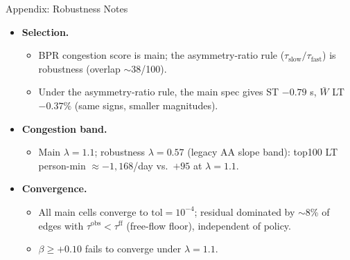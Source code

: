 \documentclass[11pt,aspectratio=169]{beamer}
\newcommand{\back}[1]{\hyperlink{#1}{\beamerreturnbutton{back}}}
\begin{document}
\begin{frame}{Appendix: Robustness Notes}
\begin{itemize}\small
  \item \textbf{Selection.}
  \begin{itemize}\footnotesize
    \item BPR congestion score is main; the asymmetry-ratio rule ($\tau_{\text{slow}}/\tau_{\text{fast}}$) is robustness (overlap $\sim$38/100).
    \item Under the asymmetry-ratio rule, the main spec gives ST $-0.79$ s, $\bar W$ LT $-0.37\%$ (same signs, smaller magnitudes).
  \end{itemize}
  \item \textbf{Congestion band.}
  \begin{itemize}\footnotesize
    \item Main $\lambda=1.1$; robustness $\lambda=0.57$ (legacy AA slope band): top100 LT person-min $\approx -1{,}168$/day vs.\ $+95$ at $\lambda=1.1$.
  \end{itemize}
  \item \textbf{Convergence.}
  \begin{itemize}\footnotesize
    \item All main cells converge to $\mathrm{tol}=10^{-4}$; residual dominated by $\sim$8\% of edges with $\tau^{\mathrm{obs}}<\tau^{\mathrm{ff}}$ (free-flow floor), independent of policy.
    \item $\beta\geq+0.10$ fails to converge under $\lambda=1.1$.
  \end{itemize}
\end{itemize}
\centering\back{data}
\end{frame}
\end{document}
